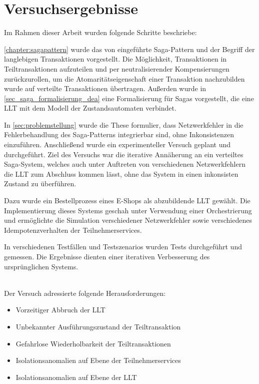 \section{Versuchsergebnisse}

Im Rahmen dieser Arbeit wurden folgende Schritte beschriebe:

\cref{chapter:sagapattern} wurde das von \citeauthor{GarciaMolina.1987} eingeführte Saga-Pattern und der Begriff der langlebigen Transaktionen vorgestellt. Die Möglichkeit, Transaktionen in Teiltransaktionen aufzuteilen und per neutralisierender Kompensierungen zurückzurollen, um die Atomaritätseigenschaft einer Transaktion nachzubilden wurde auf verteilte Transaktionen übertragen. Außerden wurde in \cref{sec_saga_formalisierung_dea} eine Formalisierung für Sagas vorgestellt, die eine LLT mit dem Modell der Zustandsautomaten verbindet. 

In \cref{sec:problemstellung} wurde die These formulier, dass Netzwerkfehler in die Fehlerbehandlung des Saga-Patterns integrierbar sind, ohne Inkonsistenzen einzuführen. Anschließend wurde ein experimenteller Versuch geplant und durchgeführt. Ziel des Versuchs war die iterative Annäherung an ein verteiltes Saga-System, welches auch unter Auftreten von verschiedenen Netzwerkfehlern die LLT zum Abschluss kommen lässt, ohne das System in einen inkonsisten Zustand zu überführen.

Dazu wurde ein Bestellprozess eines E-Shops als abzubildende LLT gewählt. Die Implementierung dieses Systems geschah unter Verwendung einer Orchestrierung und ermöglichte die Simulation verschiedener Netzwerkfehler sowie verschiedenes Idempotenzverhalten der Teilnehmerservices.

In verschiedenen Testfällen und Testszenarios wurden Tests durchgeführt und gemessen. Die Ergebnisse dienten einer iterativen Verbesserung des ursprünglichen Systems. 

\mbox{} \\
Der Versuch adressierte folgende Herausforderungen:

\begin{itemize}
	\item Vorzeitiger Abbruch der LLT
	\item Unbekannter Ausführungszustand der Teiltransaktion
	\item Gefahrlose Wiederholbarkeit der Teiltransaktionen
	\item Isolationsanomalien auf Ebene der Teilnehmerservices
	\item Isolationsanomalien auf Ebene der LLT
\end{itemize}